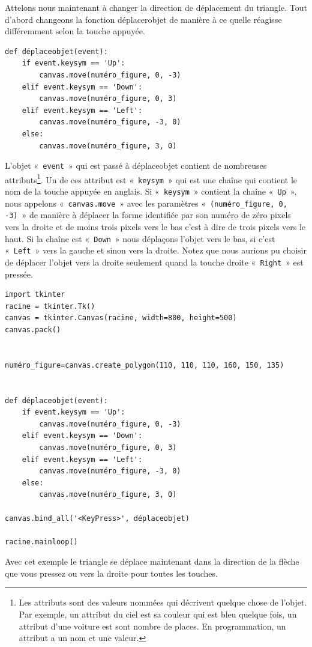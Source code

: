Attelons nous maintenant à changer la direction de déplacement du triangle. Tout d'abord changeons la fonction déplacerobjet de manière à ce quelle réagisse différemment selon la touche appuyée.
\begin{Verbatim}[frame=single,rulecolor=\color{mbleu}, label=à taper]
def déplaceobjet(event):
    if event.keysym == 'Up':
        canvas.move(numéro_figure, 0, -3)
    elif event.keysym == 'Down':
        canvas.move(numéro_figure, 0, 3)
    elif event.keysym == 'Left':
        canvas.move(numéro_figure, -3, 0)
    else:
        canvas.move(numéro_figure, 3, 0)
\end{Verbatim}

L'objet «~\texttt{event}~» qui est passé à déplaceobjet contient de nombreuses attributs\footnote{Les attributs sont des valeurs nommées qui décrivent quelque chose de l'objet. Par exemple, un attribut du ciel est sa couleur qui est bleu quelque fois, un attribut d'une voiture est sont nombre de places. En programmation, un attribut a un nom et une valeur.}. Un de ces attribut est «~\texttt{keysym}~» qui est une chaîne qui contient le nom de la touche appuyée en anglais. Si «~\texttt{keysym}~» contient la chaîne «~\texttt{Up}~», nous appelons «~\texttt{canvas.move}~»  avec les paramètres «~\texttt{(numéro\_figure, 0, -3)}~» de manière à déplacer la forme identifiée par son numéro de zéro pixels vers la droite et de moins trois pixels vers le bas c'est à dire de trois pixels vers le haut. Si la chaîne est «~\texttt{Down}~» nous déplaçons l'objet vers le bas, si c'est «~\texttt{Left}~» vers la gauche et sinon vers la droite. Notez que nous aurions pu choisir de déplacer l'objet vers la droite seulement quand la touche droite «~\texttt{Right}~» est pressée.

\begin{Verbatim}[frame=single,rulecolor=\color{mbleu}, label=à taper]
import tkinter
racine = tkinter.Tk()
canvas = tkinter.Canvas(racine, width=800, height=500)
canvas.pack()


numéro_figure=canvas.create_polygon(110, 110, 110, 160, 150, 135)


def déplaceobjet(event):
    if event.keysym == 'Up':
        canvas.move(numéro_figure, 0, -3)
    elif event.keysym == 'Down':
        canvas.move(numéro_figure, 0, 3)
    elif event.keysym == 'Left':
        canvas.move(numéro_figure, -3, 0)
    else:
        canvas.move(numéro_figure, 3, 0)

canvas.bind_all('<KeyPress>', déplaceobjet)

racine.mainloop()
\end{Verbatim}

Avec cet exemple le triangle se déplace maintenant dans la direction de la flèche que vous pressez ou vers la droite pour toutes les touches.
